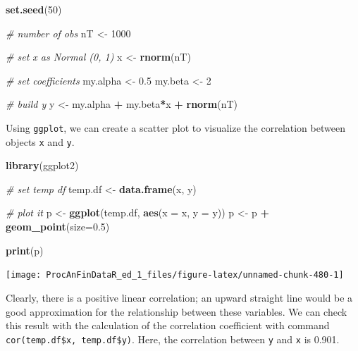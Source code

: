 \documentclass[11pt,]{book}
\newenvironment{Shaded}{\begin{snugshade}}{\end{snugshade}}
\newcommand{\KeywordTok}[1]{\textcolor[rgb]{0.27,0.27,0.27}{\textbf{#1}}}
\newcommand{\DataTypeTok}[1]{\textcolor[rgb]{0.27,0.27,0.27}{#1}}
\newcommand{\DecValTok}[1]{\textcolor[rgb]{0.06,0.06,0.06}{#1}}
\newcommand{\FloatTok}[1]{\textcolor[rgb]{0.06,0.06,0.06}{#1}}
\newcommand{\StringTok}[1]{\textcolor[rgb]{0.5,0.5,0.5}{#1}}
\newcommand{\CommentTok}[1]{\textcolor[rgb]{0.56,0.35,0.01}{\textit{#1}}}
\newcommand{\OperatorTok}[1]{\textcolor[rgb]{0.81,0.36,0.00}{\textbf{#1}}}
\newcommand{\NormalTok}[1]{#1}
\begin{document}
\begin{Shaded}
\begin{Highlighting}[]
\KeywordTok{set.seed}\NormalTok{(}\DecValTok{50}\NormalTok{)}

\CommentTok{# number of obs}
\NormalTok{nT <-}\StringTok{ }\DecValTok{1000} 

\CommentTok{# set x as Normal (0, 1)}
\NormalTok{x <-}\StringTok{ }\KeywordTok{rnorm}\NormalTok{(nT)}

\CommentTok{# set coefficients}
\NormalTok{my.alpha <-}\StringTok{ }\FloatTok{0.5}
\NormalTok{my.beta <-}\StringTok{ }\DecValTok{2}

\CommentTok{# build y}
\NormalTok{y <-}\StringTok{ }\NormalTok{my.alpha }\OperatorTok{+}\StringTok{ }\NormalTok{my.beta}\OperatorTok{*}\NormalTok{x }\OperatorTok{+}\StringTok{ }\KeywordTok{rnorm}\NormalTok{(nT)}
\end{Highlighting}
\end{Shaded}

Using \texttt{ggplot}, we can create a scatter plot to visualize the
correlation between objects \texttt{x} and \texttt{y}.

\begin{Shaded}
\begin{Highlighting}[]
\KeywordTok{library}\NormalTok{(ggplot2)}

\CommentTok{# set temp df}
\NormalTok{temp.df <-}\StringTok{ }\KeywordTok{data.frame}\NormalTok{(x, y)}

\CommentTok{# plot it}
\NormalTok{p <-}\StringTok{ }\KeywordTok{ggplot}\NormalTok{(temp.df, }\KeywordTok{aes}\NormalTok{(}\DataTypeTok{x =}\NormalTok{ x, }\DataTypeTok{y =}\NormalTok{ y))}
\NormalTok{p <-}\StringTok{ }\NormalTok{p }\OperatorTok{+}\StringTok{ }\KeywordTok{geom_point}\NormalTok{(}\DataTypeTok{size=}\FloatTok{0.5}\NormalTok{)}

\KeywordTok{print}\NormalTok{(p)}
\end{Highlighting}
\end{Shaded}

\begin{center}\texttt{[image: ProcAnFinDataR\_ed\_1\_files/figure-latex/unnamed-chunk-480-1]} \end{center}

Clearly, there is a positive linear correlation; an upward straight line
would be a good approximation for the relationship between these
variables. We can check this result with the calculation of the
correlation coefficient with command
\texttt{cor(temp.df\$x,\ temp.df\$y)}. Here, the correlation between
\texttt{y} and \texttt{x} is 0.901.
\end{document}
